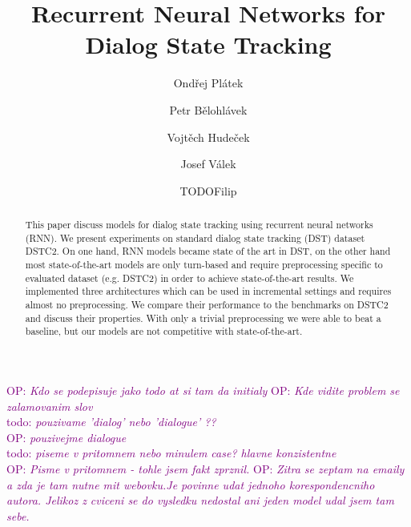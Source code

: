 \documentclass{itatnew}
\def\OP#1{\textcolor{purple}{OP: \textit{#1}}}
\def\todo#1{\textcolor{purple}{todo: \textit{#1}}}
\begin{document}
\title{Recurrent Neural Networks for Dialog State Tracking}

\author{Ondřej Plátek \and Petr Bělohlávek \and Vojtěch Hudeček \and
Josef Válek \and TODOFilip}


\maketitle              %

\OP{Kdo se podepisuje jako todo at si tam da initialy}
\OP{Kde vidite problem se zalamovanim slov} \\
\todo{pouzivame 'dialog' nebo 'dialogue' ??} \\
\OP{ pouzivejme dialogue} \\
\todo{piseme v pritomnem nebo minulem case? hlavne konzistentne} \\
\OP{Pisme v pritomnem - tohle jsem fakt zprznil.}
\OP{Zitra se zeptam na emaily a zda je tam nutne mit webovku.Je povinne udat jednoho korespondencniho autora. Jelikoz z cviceni se do vysledku nedostal ani jeden model udal jsem tam sebe.} \\

\begin{abstract}
This paper discuss models for dialog state tracking using recurrent neural networks (RNN).
We present experiments on standard dialog state tracking (DST) dataset DSTC2\cite{henderson2014second}.
On one hand, RNN models became state of the art in DST,
on the other hand most state-of-the-art models are only turn-based and require preprocessing specific to evaluated dataset (e.g. DSTC2) in order to achieve state-of-the-art results.
We implemented three architectures which can be used in incremental settings and requires almost no preprocessing.
We compare their performance to the benchmarks on DSTC2 and discuss their properties.
With only a trivial preprocessing we were able to beat a baseline, but our models are not competitive with state-of-the-art.
\end{abstract}
%
\end{document}
